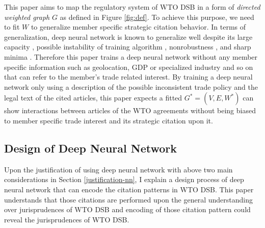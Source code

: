 \documentclass[12pt,letterpaper]{article}
\begin{document}
This paper aims to map the regulatory system of WTO DSB in a form of \textit{directed weighted graph} $G$ as defined in Figure \ref{fig:def}.
To achieve this purpose, we need to fit $W$ to generalize member specific strategic citation behavior.
In terms of generalization, deep neural network is known to generalize well despite
its large capacity \citep{neyshabur2017exploring}, possible instability of training algorithm \citep{charles2017stability}, nonrobustness \citep{zahavy2017ensemble}, and sharp minima \citep{dinh2017sharp}.
Therefore this paper trains a deep neural network without any member specific information such as geolocation, GDP or specialized industry and so on that can refer to the member's trade related interest.
By training a deep neural network only using a description of the possible inconsistent trade policy and the legal text of the cited articles,
this paper expects a fitted $G^{*} = (V, E, W^*)$ can show interactions between articles of the WTO agreements
without being biased to member specific trade interest and its strategic citation upon it.

\subsection{Design of Deep Neural Network}\label{subsec:design:dnn}
Upon the justification of using deep neural network with above two main considerations in Section \ref{justification-nn}, %
I explain a design process of deep neural network that can encode the citation patterns in WTO DSB.
This paper understands that those citations are performed upon the general understanding over jurisprudences of WTO DSB and encoding of
those citation pattern could reveal the jurisprudences of WTO DSB.






\end{document}
